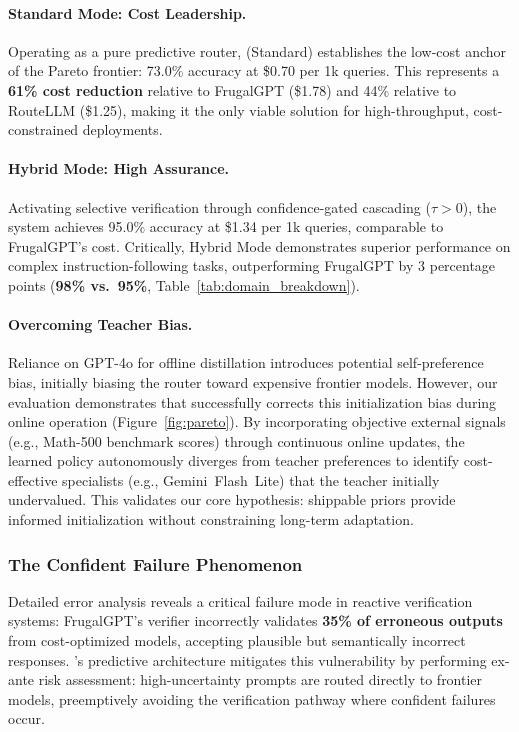 \paragraph{Standard Mode: Cost Leadership.} Operating as a pure predictive router, \ours{} (Standard) establishes the low-cost anchor of the Pareto frontier: 73.0\% accuracy at \$0.70 per 1k queries. This represents a \textbf{61\% cost reduction} relative to FrugalGPT (\$1.78) and 44\% relative to RouteLLM (\$1.25), making it the only viable solution for high-throughput, cost-constrained deployments.

\paragraph{Hybrid Mode: High Assurance.} Activating selective verification through confidence-gated cascading ($\tau > 0$), the system achieves 95.0\% accuracy at \$1.34 per 1k queries, comparable to FrugalGPT's cost. Critically, Hybrid Mode demonstrates superior performance on complex instruction-following tasks, outperforming FrugalGPT by 3 percentage points (\textbf{98\% vs.\ 95\%}, Table~\ref{tab:domain_breakdown}).

\paragraph{Overcoming Teacher Bias.} Reliance on GPT-4o for offline distillation introduces potential self-preference bias, initially biasing the router toward expensive frontier models. However, our evaluation demonstrates that \ours{} successfully corrects this initialization bias during online operation (Figure~\ref{fig:pareto}). By incorporating objective external signals (e.g., Math-500 benchmark scores) through continuous online updates, the learned policy autonomously diverges from teacher preferences to identify cost-effective specialists (e.g., Gemini~Flash~Lite) that the teacher initially undervalued. This validates our core hypothesis: shippable priors provide informed initialization without constraining long-term adaptation.

\subsubsection{The Confident Failure Phenomenon}
\label{sec:confident_failure}

\begin{sloppypar}
Detailed error analysis reveals a critical failure mode in reactive verification systems: FrugalGPT's verifier incorrectly validates \textbf{35\% of erroneous outputs} from cost-optimized models, accepting plausible but semantically incorrect responses. \ours{}'s predictive architecture mitigates this vulnerability by performing ex-ante risk assessment: high-uncertainty prompts are routed directly to frontier models, preemptively avoiding the verification pathway where confident failures occur.
\end{sloppypar}

